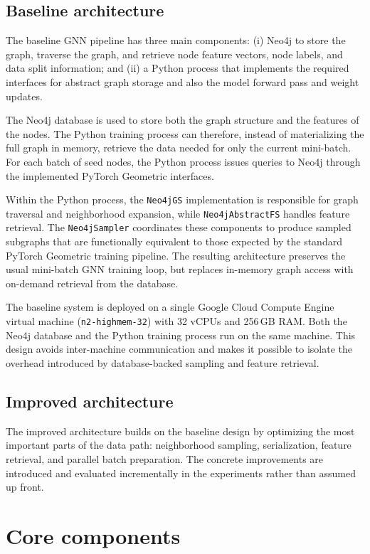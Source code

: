 \documentclass[PhD]{uclathes}
\begin{document}
\subsection{Baseline architecture}
The baseline GNN pipeline has three main components: (i) Neo4j to store the
graph, traverse the graph, and retrieve node feature vectors, node labels, and
data split information; and (ii) a Python process that implements the required
interfaces for abstract graph storage and also the model forward pass and
weight updates.

The Neo4j database is used to store both the graph structure and the features
of the nodes. The Python training process can therefore, instead of
materializing the full graph in memory, retrieve the data needed for only the
current mini-batch. For each batch of seed nodes, the Python process issues
queries to Neo4j through the implemented PyTorch Geometric interfaces.

Within the Python process, the \texttt{Neo4jGS} implementation is responsible
for graph traversal and neighborhood expansion, while \texttt{Neo4jAbstractFS}
handles feature retrieval. The \texttt{Neo4jSampler} coordinates these
components to produce sampled subgraphs that are functionally equivalent to
those expected by the standard PyTorch Geometric training pipeline. The
resulting architecture preserves the usual mini-batch GNN training loop, but
replaces in-memory graph access with on-demand retrieval from the database.

The baseline system is deployed on a single Google Cloud Compute Engine virtual
machine (\texttt{n2-highmem-32}) with 32 vCPUs and 256\,GB RAM. Both the Neo4j
database and the Python training process run on the same machine. This design
avoids inter-machine communication and makes it possible to isolate the
overhead introduced by database-backed sampling and feature retrieval.

\subsection{Improved architecture}
The improved architecture builds on the baseline design by optimizing the most
important parts of the data path: neighborhood sampling, serialization, feature
retrieval, and parallel batch preparation. The concrete improvements are
introduced and evaluated incrementally in the experiments rather than assumed
up front.

\section{Core components}
\end{document}
